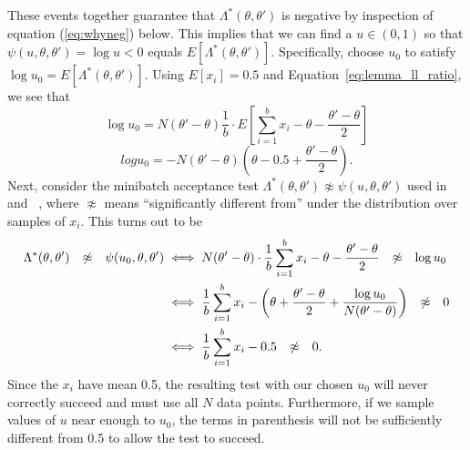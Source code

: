 \documentclass{article}
\begin{document}
These events together guarantee that $\Lambda^*(\theta,\theta')$ is negative
by inspection of equation (\ref{eq:whyneg}) below.
This implies that we can find a $u \in (0,1)$ so that
$\psi(u,\theta,\theta') = \log u < 0$ equals $E[\Lambda^*(\theta,\theta')]$.
Specifically, choose $u_0$ to satisfy $\log u_0 = E[\Lambda^*(\theta,\theta')]$.
Using $E[x_i] = 0.5$ and Equation~\ref{eq:lemma_ll_ratio}, we see that
\begin{equation}
  \log u_0 = N(\theta'-\theta)\frac{1}{b} \cdot E\left[\sum_{i=1}^b x_i-\theta-\frac{\theta'-\theta}{2}\right]
\end{equation}
\begin{equation}\label{eq:whyneg}
    log u_0 = -N(\theta'-\theta)\left(\theta-0.5+\frac{\theta'-\theta}{2}\right).
\end{equation}
Next, consider the minibatch acceptance test $\Lambda^*(\theta,\theta') \not\approx
\psi(u,\theta,\theta')$ used in ~\cite{cutting_mh_2014} and~\cite{icml2014c1_bardenet14} , where $\not\approx$
means ``significantly different from'' under the distribution over
samples of $x_i$. This turns out to be
\begin{align}
\Lambda^*(\theta,\theta') \hspace{0.1in} \not\approx \hspace{0.1in}
\psi(u_0,\theta,\theta') &\iff N(\theta'-\theta) \cdot \frac{1}{b}\sum_{i=1}^b x_i-\theta-\frac{\theta'-\theta}{2} \hspace{0.1in} \not\approx \hspace{0.1in} \log u_0 \\
&\iff \frac{1}{b}\sum_{i=1}^b x_i-\left(\theta+\frac{\theta'-\theta}{2} + \frac{\log u_0}{N(\theta'-\theta)}\right) \hspace{0.1in} \not\approx \hspace{0.1in} 0 \\
&\iff \frac{1}{b}\sum_{i=1}^b x_i-0.5 \hspace{0.1in} \not\approx \hspace{0.1in} 0. \label{eq:accept_test_zero}
\end{align}
Since the $x_i$ have mean 0.5, the resulting test with our chosen $u_0$ will
never correctly succeed and must use all $N$ data points.  Furthermore, if we
sample values of $u$ near enough to $u_0$, the terms in parenthesis will not be
sufficiently different from 0.5 to allow the test to succeed. 
  
\end{document}
